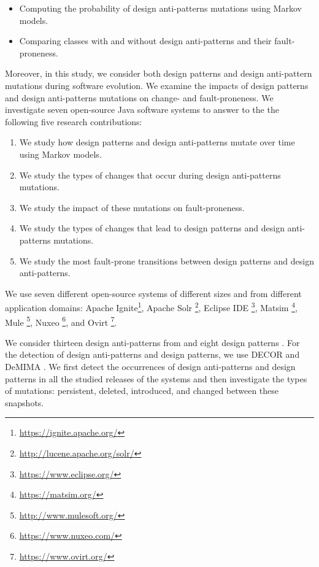 \begin{itemize}
\item Computing the probability of design anti-patterns mutations using Markov models.

\item Comparing classes with and without design anti-patterns and their fault-proneness. 
\end{itemize}

 \noindent Moreover, in this study, we consider both design patterns and design anti-pattern mutations during software evolution. We examine the impacts of design patterns and design anti-patterns mutations on change- and fault-proneness. We investigate seven open-source Java software systems to answer to the the following five research contributions:

 \begin{enumerate}
 \item We study how design patterns and design anti-patterns mutate over time using Markov models.

 \item We study the types of changes that occur during design anti-patterns mutations.

 \item We study the impact of these mutations on fault-proneness.

 \item We study the types of changes that lead to design patterns and design anti-patterns mutations.

 \item We study the most fault-prone transitions between design patterns and design anti-patterns.
 \end{enumerate}

We use seven different open-source systems of different sizes and from different application domains: Apache Ignite\footnote{\url{https://ignite.apache.org/}}, Apache Solr \footnote{\url{http://lucene.apache.org/solr/}}, Eclipse IDE \footnote{\url{https://www.eclipse.org/}}, Matsim \footnote{\url{https://matsim.org/}}, Mule \footnote{\url{http://www.mulesoft.org/}}, Nuxeo \footnote{\url{https://www.nuxeo.com/}}, and Ovirt \footnote{\url{https://www.ovirt.org/}}.

We consider thirteen design anti-patterns from \cite{brown1998antipatterns} and eight design patterns \cite{gamma1995design}. For the detection of design anti-patterns and design patterns, we use DECOR \cite{moha2010decor} and DeMIMA \cite{gueheneuc2008demima}. We first detect the occurrences of design anti-patterns and design patterns in all the studied releases of the systems and then investigate the types of mutations: persistent, deleted, introduced, and changed between these snapshots.

